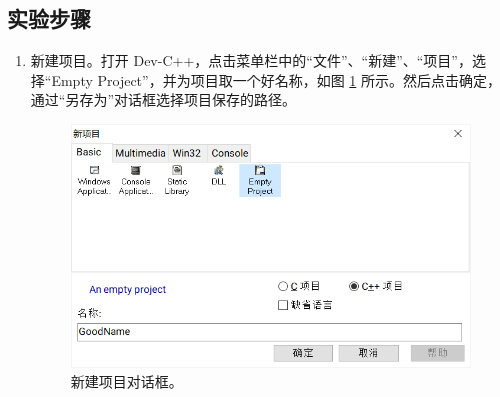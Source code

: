 \subsection*{实验步骤}

\begin{enumerate}
	\item 新建项目。打开 Dev-C++，点击菜单栏中的“文件”、“新建”、“项目”，选择“Empty Project”，并为项目取一个好名称，如图 \ref{fig:multi-source-1} 所示。然后点击确定，通过“另存为”对话框选择项目保存的路径。

	\begin{figure}
		\centering
		\includegraphics[width=0.75\linewidth]{assets/multi-source-1}
		\caption{新建项目对话框。}
		\label{fig:multi-source-1}
	\end{figure}
\end{enumerate}
